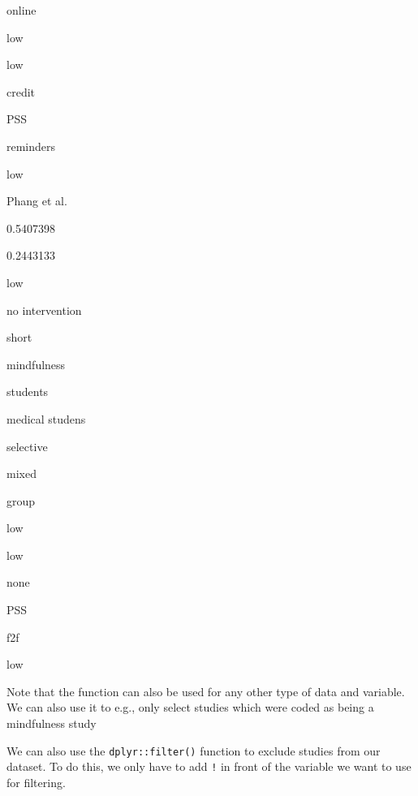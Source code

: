 \documentclass[]{book}
\newenvironment{Shaded}{\begin{snugshade}}{\end{snugshade}}
\newcommand{\DataTypeTok}[1]{\textcolor[rgb]{0.13,0.29,0.53}{#1}}
\newcommand{\KeywordTok}[1]{\textcolor[rgb]{0.13,0.29,0.53}{\textbf{#1}}}
\newcommand{\NormalTok}[1]{#1}
\newcommand{\OperatorTok}[1]{\textcolor[rgb]{0.81,0.36,0.00}{\textbf{#1}}}
\newcommand{\StringTok}[1]{\textcolor[rgb]{0.31,0.60,0.02}{#1}}
\begin{document}
online

low

low

credit

PSS

reminders

low

Phang et al.

0.5407398

0.2443133

low

no intervention

short

mindfulness

students

medical studens

selective

mixed

group

low

low

none

PSS

f2f

low

Note that the function can also be used for any other type of data and variable. We can also use it to e.g., only select studies which were coded as being a mindfulness study

\begin{Shaded}
\end{Shaded}

We can also use the \texttt{dplyr::filter()} function to exclude studies from our dataset. To do this, we only have to add \texttt{!} in front of the variable we want to use for filtering.

\begin{Shaded}
\end{Shaded}
\end{document}
